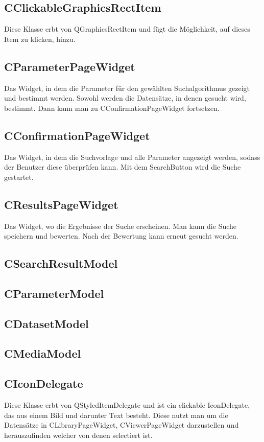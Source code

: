 \subsection*{CClickableGraphicsRectItem}
Diese Klasse erbt von QGraphicsRectItem und fügt die Möglichkeit, auf dieses Item zu klicken, hinzu.

\subsection*{CParameterPageWidget}
Das Widget, in dem die Parameter für den gewählten Suchalgorithmus gezeigt und bestimmt werden. Sowohl werden die Datensätze, in denen gesucht wird, bestimmt. Dann kann man zu CConfirmationPageWidget fortsetzen.

\subsection*{CConfirmationPageWidget}
Das Widget, in dem die Suchvorlage und alle Parameter angezeigt werden, sodass der Benutzer diese überprüfen kann. Mit dem SearchButton wird die Suche gestartet.

\subsection*{CResultsPageWidget}
Das Widget, wo die Ergebnisse der Suche erscheinen. Man kann die Suche speichern und bewerten. Nach der Bewertung kann erneut gesucht werden.

\subsection*{CSearchResultModel}

\subsection*{CParameterModel}

\subsection*{CDatasetModel}

\subsection*{CMediaModel}

\subsection*{CIconDelegate}
Diese Klasse erbt von QStyledItemDelegate und ist ein clickable IconDelegate, das aus einem Bild und darunter Text besteht. Diese nutzt man um die Datensätze in CLibraryPageWidget, CViewerPageWidget darzustellen und herauszufinden welcher von denen selectiert ist.

